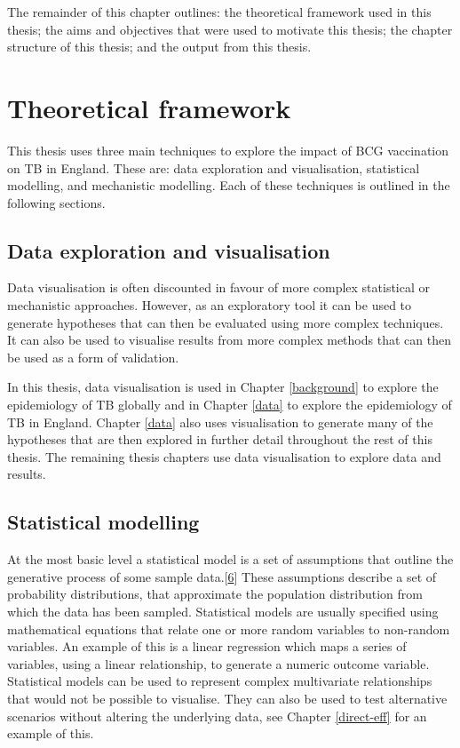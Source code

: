 \documentclass[11pt,twoside]{bristolthesis}
\begin{document}
  The remainder of this chapter outlines: the theoretical framework used in this thesis; the aims and objectives that were used to motivate this thesis; the chapter structure of this thesis; and the output from this thesis.
  
  \hypertarget{theoretical-framework}{%
  \section{Theoretical framework}\label{theoretical-framework}}
  
  This thesis uses three main techniques to explore the impact of BCG vaccination on TB in England. These are: data exploration and visualisation, statistical modelling, and mechanistic modelling. Each of these techniques is outlined in the following sections.
  
  \hypertarget{data-exploration-and-visualisation}{%
  \subsection{Data exploration and visualisation}\label{data-exploration-and-visualisation}}
  
  Data visualisation is often discounted in favour of more complex statistical or mechanistic approaches. However, as an exploratory tool it can be used to generate hypotheses that can then be evaluated using more complex techniques. It can also be used to visualise results from more complex methods that can then be used as a form of validation.
  
  In this thesis, data visualisation is used in Chapter \ref{background} to explore the epidemiology of TB globally and in Chapter \ref{data} to explore the epidemiology of TB in England. Chapter \ref{data} also uses visualisation to generate many of the hypotheses that are then explored in further detail throughout the rest of this thesis. The remaining thesis chapters use data visualisation to explore data and results.
  
  \hypertarget{statistical-modelling}{%
  \subsection{Statistical modelling}\label{statistical-modelling}}
  
  At the most basic level a statistical model is a set of assumptions that outline the generative process of some sample data.{[}\protect\hyperlink{ref-McElreath:2018j}{6}{]} These assumptions describe a set of probability distributions, that approximate the population distribution from which the data has been sampled. Statistical models are usually specified using mathematical equations that relate one or more random variables to non-random variables. An example of this is a linear regression which maps a series of variables, using a linear relationship, to generate a numeric outcome variable. Statistical models can be used to represent complex multivariate relationships that would not be possible to visualise. They can also be used to test alternative scenarios without altering the underlying data, see Chapter \ref{direct-eff} for an example of this.
  
\end{document}
